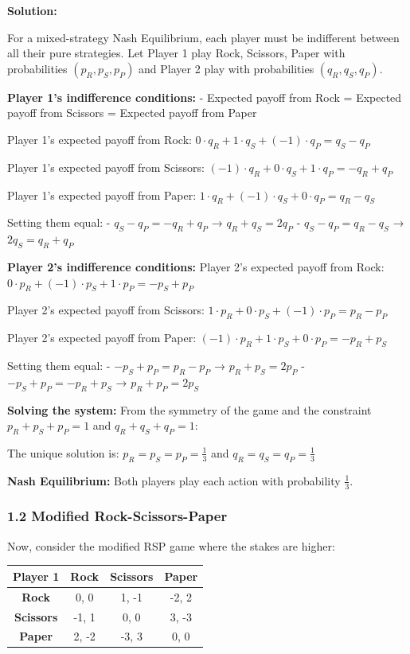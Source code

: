 \documentclass[12pt]{article}
\begin{document}
{{{{\textbf{Solution:}

For a mixed-strategy Nash Equilibrium, each player must be indifferent between all their pure strategies. Let Player 1 play Rock, Scissors, Paper with probabilities $(p_R, p_S, p_P)$ and Player 2 play with probabilities $(q_R, q_S, q_P)$.

\textbf{Player 1's indifference conditions:}
- Expected payoff from Rock = Expected payoff from Scissors = Expected payoff from Paper

Player 1's expected payoff from Rock: $0 \cdot q_R + 1 \cdot q_S + (-1) \cdot q_P = q_S - q_P$

Player 1's expected payoff from Scissors: $(-1) \cdot q_R + 0 \cdot q_S + 1 \cdot q_P = -q_R + q_P$

Player 1's expected payoff from Paper: $1 \cdot q_R + (-1) \cdot q_S + 0 \cdot q_P = q_R - q_S$

Setting them equal:
- $q_S - q_P = -q_R + q_P$ → $q_R + q_S = 2q_P$
- $q_S - q_P = q_R - q_S$ → $2q_S = q_R + q_P$

\textbf{Player 2's indifference conditions:}
Player 2's expected payoff from Rock: $0 \cdot p_R + (-1) \cdot p_S + 1 \cdot p_P = -p_S + p_P$

Player 2's expected payoff from Scissors: $1 \cdot p_R + 0 \cdot p_S + (-1) \cdot p_P = p_R - p_P$

Player 2's expected payoff from Paper: $(-1) \cdot p_R + 1 \cdot p_S + 0 \cdot p_P = -p_R + p_S$

Setting them equal:
- $-p_S + p_P = p_R - p_P$ → $p_R + p_S = 2p_P$
- $-p_S + p_P = -p_R + p_S$ → $p_R + p_P = 2p_S$

\textbf{Solving the system:}
From the symmetry of the game and the constraint $p_R + p_S + p_P = 1$ and $q_R + q_S + q_P = 1$:

The unique solution is: $p_R = p_S = p_P = \frac{1}{3}$ and $q_R = q_S = q_P = \frac{1}{3}$

\textbf{Nash Equilibrium:} Both players play each action with probability $\frac{1}{3}$.

\subsubsection{1.2 Modified Rock-Scissors-Paper}

Now, consider the modified RSP game where the stakes are higher:

\begin{center}
\begin{tabular}{|c|c|c|c|}
\hline
Player 1 & Rock & Scissors & Paper \\
\hline
\textbf{Rock} & 0, 0 & 1, -1 & -2, 2 \\
\textbf{Scissors} & -1, 1 & 0, 0 & 3, -3 \\
\textbf{Paper} & 2, -2 & -3, 3 & 0, 0 \\
\hline
\end{tabular}
\end{center}

}}}}
\end{document}

